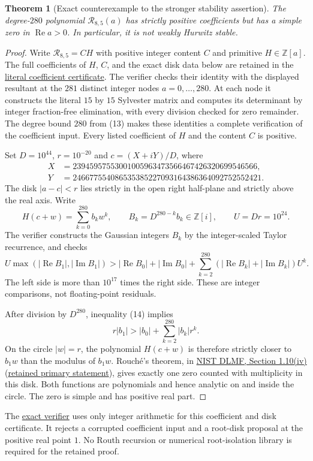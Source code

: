 \documentclass[11pt]{article}
\newtheorem{theorem}{Theorem}
\begin{document}
\begin{theorem}[Exact counterexample to the stronger stability assertion]
\label{thm:resultant-hurwitz-counterexample}
The degree-$280$ polynomial $\mathcal R_{8,5}(a)$ has strictly
positive coefficients but has a simple zero in $\operatorname{Re}a>0$.
In particular, it is not weakly Hurwitz stable.
\end{theorem}
\begin{proof}
Write $\mathcal R_{8,5}=C H$ with positive integer content $C$
and primitive $H\in\mathbb Z[a]$.
The full coefficients of $H$, $C$, and the exact disk data below
are retained in the
\href{arithmetic_frontier_terminal_orders_resultant_hurwitz_counterexample.json}
{literal coefficient certificate}.
The verifier checks their identity with the displayed resultant
at the $281$ distinct integer nodes $a=0,\ldots,280$.
At each node it constructs the literal $15$ by $15$ Sylvester
matrix and computes its determinant by integer fraction-free
elimination, with every division checked for zero remainder.
The degree bound $280$ from (13) makes these identities a complete
verification of the coefficient input. Every listed coefficient
of $H$ and the content $C$ is positive.

Set $D=10^{44}$, $r=10^{-20}$ and $c=(X+iY)/D$, where
\[
 \begin{aligned}
 X&=23945957553001005963473566467426320699546566,\\
 Y&=246677554086535385227093164386364092752552421.
 \end{aligned}
\]
The disk $|a-c|<r$ lies strictly in the open right half-plane
and strictly above the real axis. Write
\[
 H(c+w)=\sum_{k=0}^{280}b_kw^k,\qquad
 B_k=D^{280-k}b_k\in\mathbb Z[i],\qquad U=Dr=10^{24}.
\]
The verifier constructs the Gaussian integers $B_k$ by the
integer-scaled Taylor recurrence, and checks
\[
 U\max(|\operatorname{Re}B_1|,|\operatorname{Im}B_1|)
 >
 |\operatorname{Re}B_0|+|\operatorname{Im}B_0|
 +\sum_{k=2}^{280}
     (|\operatorname{Re}B_k|+|\operatorname{Im}B_k|)U^k.       \tag{14}
\]
The left side is more than $10^{17}$ times the right side.
These are integer comparisons, not floating-point residuals.

After division by $D^{280}$, inequality (14) implies
\[
 r|b_1|>|b_0|+\sum_{k=2}^{280}|b_k|r^k.
\]
On the circle $|w|=r$, the polynomial $H(c+w)$ is therefore
strictly closer to $b_1w$ than the modulus of $b_1w$.
Rouch\'e's theorem, in
\href{https://dlmf.nist.gov/1.10.iv}{NIST DLMF, Section 1.10(iv)}
(\href{sources/dlmf-1-10-rouche.html}{retained primary statement}),
gives exactly one zero counted with multiplicity in this disk.
Both functions are polynomials and hence analytic on and inside
the circle. The zero is simple and has positive real part.
\end{proof}
The
\href{arithmetic_frontier_terminal_orders.py}{exact verifier}
uses only integer arithmetic for this coefficient and disk
certificate. It rejects a corrupted coefficient input and a
root-disk proposal at the positive real point $1$.
No Routh recursion or numerical root-isolation library is required
for the retained proof.
\end{document}
